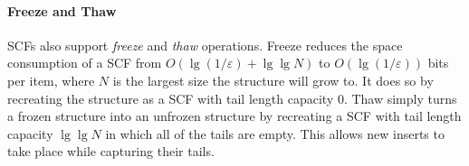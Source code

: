 \documentclass[letterpaper,twocolumn,10pt]{article}
\newcommand{\taffy}{stretchy}
\newcommand{\TBF}{SBF}
\newcommand{\TCF}{SCF}
\newcommand{\taffy}{taffy}
\newcommand{\TBF}{TBF}
\newcommand{\TCF}{TCF}
\begin{document}





\paragraph{Freeze and Thaw}
\TCF{}s also support {\em freeze} and {\em thaw} operations.
Freeze reduces the space consumption of a \TCF{} from $O(\lg(1/\varepsilon) + \lg \lg N)$ to $O(\lg (1 / \varepsilon))$ bits per item, where $N$ is the largest size the structure will grow to.
It does so by recreating the structure as a \TCF{} with tail length capacity $0$.
Thaw simply turns a frozen structure into an unfrozen structure by recreating a \TCF{} with tail length capacity $\lg \lg N$ in which all of the tails are empty.
This allows new inserts to take place while capturing their tails.
\end{document}
